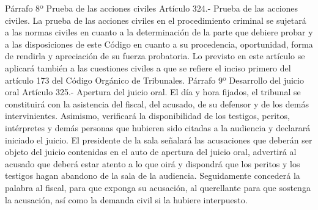     Párrafo 8º Prueba de las acciones civiles
    Artículo 324.- Prueba de las acciones civiles. La prueba de las acciones civiles en el procedimiento criminal se sujetará a las normas civiles en cuanto a la determinación de la parte que debiere probar y a las disposiciones de este Código en cuanto a su procedencia, oportunidad, forma de rendirla y apreciación de su fuerza probatoria.
    Lo previsto en este artículo se aplicará también a las cuestiones civiles a que se refiere el inciso primero del artículo 173 del Código Orgánico de Tribunales.
    Párrafo 9º Desarrollo del juicio oral
    Artículo 325.- Apertura del juicio oral. El día y hora fijados, el tribunal se constituirá con la asistencia del fiscal, del acusado, de su defensor y de los demás intervinientes. Asimismo, verificará la disponibilidad de los testigos, peritos, intérpretes y demás personas que hubieren sido citadas a la audiencia y declarará iniciado el juicio.
    El presidente de la sala señalará las acusaciones que deberán ser objeto del juicio contenidas en el auto de apertura del juicio oral, advertirá al acusado que deberá estar atento a lo que oirá y dispondrá que los peritos y los testigos hagan abandono de la sala de la audiencia.
    Seguidamente concederá la palabra al fiscal, para que exponga su acusación, al querellante para que sostenga la acusación, así como la demanda civil si la hubiere interpuesto.

